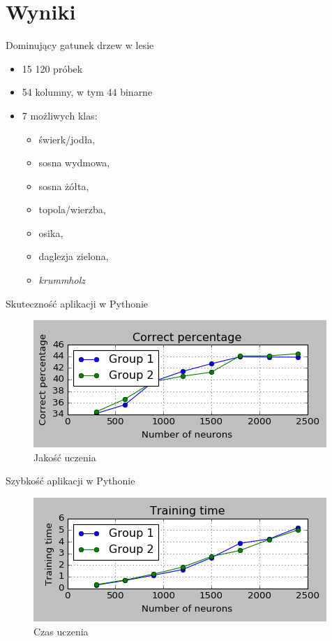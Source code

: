\documentclass{beamer}
\begin{document}
\section{Wyniki}
\begin{frame}{Dominujący gatunek drzew w lesie}
\begin{itemize}
\item 15 120 próbek
\item 54 kolumny, w tym 44 binarne
\item 7 możliwych klas:
\begin{itemize}
\item świerk/jodła,
\item sosna wydmowa,
\item sosna żółta,
\item topola/wierzba,
\item osika,
\item daglezja zielona,
\item \textit{krummholz}
\end{itemize}
\end{itemize}
\end{frame}

\begin{frame}{Skuteczność aplikacji w Pythonie}
\begin{figure}[H]
\includegraphics[width=\textwidth]{wyniki_forest_python_percentage.png}
\caption{Jakość uczenia}
\end{figure}
\end{frame}

\begin{frame}{Szybkość aplikacji w Pythonie}
\begin{figure}[H]
\includegraphics[width=\textwidth]{wyniki_forest_python_training_time.png}
\caption{Czas uczenia}
\end{figure}
\end{frame}
\end{document}
